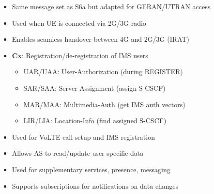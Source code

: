 
\begin{itemize}
\tightlist
\item
  Same message set as S6a but adapted for GERAN/\allowbreak{}UTRAN access
\item
  Used when UE is connected via 2G/\allowbreak{}3G radio
\item
  Enables seamless handover between 4G and 2G/\allowbreak{}3G (IRAT)
\end{itemize}


\begin{itemize}
\tightlist
\item
  \textbf{Cx}: Registration/\allowbreak{}de-registration of IMS users

  \begin{itemize}
  \tightlist
  \item
    UAR/\allowbreak{}UAA: User-Authorization (during REGISTER)
  \item
    SAR/\allowbreak{}SAA: Server-Assignment (assign S-CSCF)
  \item
    MAR/\allowbreak{}MAA: Multimedia-Auth (get IMS auth vectors)
  \item
    LIR/\allowbreak{}LIA: Location-Info (find assigned S-CSCF)
  \end{itemize}
\item
  Used for VoLTE call setup and IMS registration
\end{itemize}


\begin{itemize}
\tightlist
\item
  Allows AS to read/\allowbreak{}update user-specific data
\item
  Used for supplementary services, presence, messaging
\item
  Supports subscriptions for notifications on data changes
\end{itemize}




\CNchained{}


